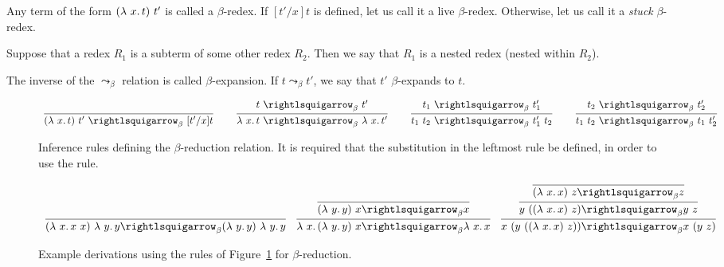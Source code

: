 \begin{definition}
  Any term of the form $(\lam{x}{t})\ t'$ is called a $\beta$-redex.
  If $[t'/x]t$ is defined, let us call it a live $\beta$-redex.  Otherwise, let us call it
  a \emph{stuck} $\beta$-redex.
  \end{definition}

\begin{definition}
  Suppose that a redex $R_1$ is a subterm of some other redex $R_2$.
  Then we say that $R_1$ is a nested redex (nested within $R_2$).
  \end{definition}
 
\begin{definition}
\label{def:betaexpand}
  The inverse of the $\leadsto_\beta$ relation is called
  $\beta$-expansion.  If $t \leadsto_\beta t'$, we say
  that $t'$ $\beta$-expands to $t$.
\end{definition}

\begin{figure}
  \[
  \begin{array}{lllllll}
\infer{(\lam{x}{t})\ t'\ \betar\ [t'/x]t}{\ } & \ &
\infer{\lam{x}{t}\ \betar\ \lam{x}{t'}}{t\ \betar\ t'} & \ &
\infer{t_1\ t_2\ \betar\ t_1'\ t_2}{t_1\ \betar\ t_1'} &\ &
\infer{t_1\ t_2\ \betar\ t_1\ t_2'}{t_2\ \betar\ t_2'}
  \end{array}
  \]
  \caption{Inference rules defining the $\beta$-reduction relation.  It is required that the substitution in the leftmost rule be defined, in order to use the rule.}
  \label{fig:betar}
\end{figure}

\begin{figure}
  \[
  \begin{array}{lll}
    \infer{(\lam{x}{x\ x})\ \lam{y}{y} \betar (\lam{y}{y})\ \lam{y}{y}}
          {\ }
    &
    \infer{\lam{x}{(\lam{y}{y})\ x} \betar \lam{x}{x}}
          {\infer{(\lam{y}{y})\ x \betar x}{\ }}

    &

    \infer{x\ (y\ ((\lam{x}{x})\ z)) \betar x\ (y\ z)}
          {\infer{y\ ((\lam{x}{x})\ z) \betar y\ z}
            {\infer{(\lam{x}{x})\ z \betar z}{\ }}}
  \end{array}
\]
\caption{Example derivations using the rules of Figure~\ref{fig:betar} for $\beta$-reduction.}
\label{fig:betarex}
\end{figure}

